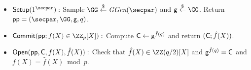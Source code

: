 

\begin{itemize}
\item $\pro{Setup}(1^\secpar):$ Sample $ \GG \sample \ggen(\secpar)$
			and $ \gr{g} \sample \GG$. Return $\params = (\secpar,\GG,\gr{g}, q)$.
\item $\pro{Commit}(\params;f(X) \in \ZZ_p[X]):$ Compute $\mathsf{C} \gets \mathsf{g}^{\hat{f}(q)}$ and return $(\mathsf{C};\hat{f}(X))$.
\item $\textsf{{Open}}(\textsf{pp},\mathsf{C}, f(X), \hat{f}(X)):$ Check that $\hat{f}(X)\in \ZZ(q/2)[X]$ and $\mathsf{g}^{\hat{f}(q)} = \mathsf{C}$ and $f(X) = \hat{f}(X) \bmod p$. 
\end{itemize}

